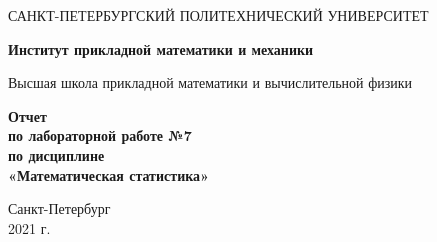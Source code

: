 \begin{titlepage}
   \begin{center}
       \vspace*{3cm}
       \large{САНКТ-ПЕТЕРБУРГСКИЙ ПОЛИТЕХНИЧЕСКИЙ УНИВЕРСИТЕТ}
       \vspace{0.4 cm}

       \large\textbf{Институт прикладной математики и механики}
       \vspace{0.4 cm}

       \large{Высшая школа прикладной математики и вычислительной физики}

       \vspace{3 cm}
       \normalsize\textbf{Отчет\\ по лабораторной работе №7\\ по дисциплине\\
«Математическая статистика»}
       \vfill

       \vspace{0.8cm}


       \normalsize{Санкт-Петербург\\2021 г.}

   \end{center}
\end{titlepage}